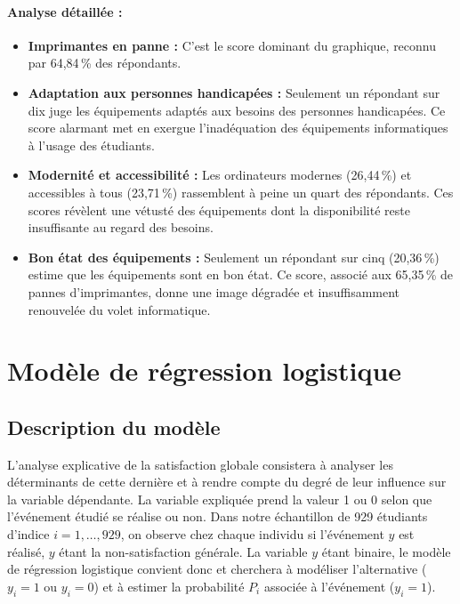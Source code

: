 \documentclass[
12pt,          %
a4paper,       %
oneside,      %
openright      %
]{report}          %
\begin{document}
		\paragraph{Analyse détaillée :}
		\begin{itemize}
			\item \textbf{Imprimantes en panne :} C'est le score dominant du graphique, reconnu par 64,84\,\% des répondants.
			\item \textbf{Adaptation aux personnes handicapées :} Seulement un répondant sur dix juge les équipements adaptés aux besoins des personnes handicapées. Ce score alarmant met en exergue l'inadéquation des équipements informatiques à l'usage des étudiants.
			\item \textbf{Modernité et accessibilité :} Les ordinateurs modernes (26,44\,\%) et accessibles à tous (23,71\,\%) rassemblent à peine un quart des répondants. Ces scores révèlent une vétusté des équipements dont la disponibilité reste insuffisante au regard des besoins.
			\item \textbf{Bon état des équipements :} Seulement un répondant sur cinq (20,36\,\%) estime que les équipements sont en bon état. Ce score, associé aux 65,35\,\% de pannes d'imprimantes, donne une image dégradée et insuffisamment renouvelée du volet informatique.
		\end{itemize}
		
		
		
		
		
		\section{Modèle de régression logistique}
		\subsection{Description du modèle}
		L'analyse explicative de la satisfaction globale consistera à analyser les déterminants de cette dernière et à rendre compte du degré de leur influence sur la variable dépendante. La variable expliquée prend la valeur 1 ou 0 selon que l'événement étudié se réalise ou non. Dans notre échantillon de 929 étudiants d'indice $i = 1, \ldots, 929$, on observe chez chaque individu si l'événement $y$ est réalisé, $y$ étant la non-satisfaction générale. La variable $y$ étant binaire, le modèle de régression logistique convient donc et cherchera à modéliser l'alternative ($y_i = 1$ ou $y_i = 0$) et à estimer la probabilité $P_i$ associée à l'événement ($y_i = 1$).
		
\end{document}
